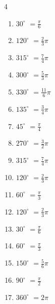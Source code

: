 \begin{multicols}{4}
\begin{enumerate}
  \item $\displaystyle 30^{\circ}$
        $\displaystyle =\frac{\pi}{6}$

  \item $\displaystyle 120^{\circ}$
        $\displaystyle =\frac{2}{3}\pi$

  \item $\displaystyle 315^{\circ}$
        $\displaystyle =\frac{7}{4}\pi$

  \item $\displaystyle 300^{\circ}$
        $\displaystyle =\frac{5}{3}\pi$

  \item $\displaystyle 330^{\circ}$
        $\displaystyle =\frac{11}{6}\pi$

  \item $\displaystyle 135^{\circ}$
        $\displaystyle =\frac{3}{4}\pi$

  \item $\displaystyle 45^{\circ}$
        $\displaystyle =\frac{\pi}{4}$

  \item $\displaystyle 270^{\circ}$
        $\displaystyle =\frac{3}{2}\pi$

  \item $\displaystyle 315^{\circ}$
        $\displaystyle =\frac{7}{4}\pi$

  \item $\displaystyle 120^{\circ}$
        $\displaystyle =\frac{2}{3}\pi$

  \item $\displaystyle 60^{\circ}$
        $\displaystyle =\frac{\pi}{3}$

  \item $\displaystyle 120^{\circ}$
        $\displaystyle =\frac{2}{3}\pi$

  \item $\displaystyle 30^{\circ}$
        $\displaystyle =\frac{\pi}{6}$

  \item $\displaystyle 60^{\circ}$
        $\displaystyle =\frac{\pi}{3}$

  \item $\displaystyle 150^{\circ}$
        $\displaystyle =\frac{5}{6}\pi$

  \item $\displaystyle 90^{\circ}$
        $\displaystyle =\frac{\pi}{2}$

  \item $\displaystyle 360^{\circ}$
        $\displaystyle =2\pi$


\end{enumerate}
\end{multicols}
